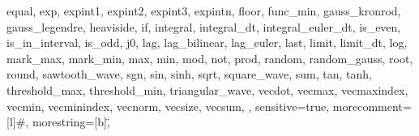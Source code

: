 {{      equal,
      exp,
      expint1,
      expint2,
      expint3,
      expintn,
      floor,
      func_min,
      gauss_kronrod,
      gauss_legendre,
      heaviside,
      if,
      integral,
      integral_dt,
      integral_euler_dt,
      is_even,
      is_in_interval,
      is_odd,
      j0,
      lag,
      lag_bilinear,
      lag_euler,
      last,
      limit,
      limit_dt,
      log,
      mark_max,
      mark_min,
      max,
      min,
      mod,
      not,
      prod,
      random,
      random_gauss,
      root,
      round,
      sawtooth_wave,
      sgn,
      sin,
      sinh,
      sqrt,
      square_wave,
      sum,
      tan,
      tanh,
      threshold_max,
      threshold_min,
      triangular_wave,
      vecdot,
      vecmax,
      vecmaxindex,
      vecmin,
      vecminindex,
      vecnorm,
      vecsize,
      vecsum,
},
sensitive=true,
morecomment=[l]{\#},
morestring=[b]\",
}
